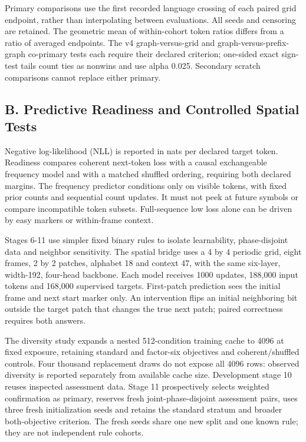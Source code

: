 \documentclass[10pt,letterpaper,twocolumn]{article}
\begin{document}
Primary comparisons use the first recorded language crossing of each paired grid endpoint, rather than interpolating between evaluations. All seeds and censoring are retained. The geometric mean of within-cohort token ratios differs from a ratio of averaged endpoints. The v4 graph-versus-grid and graph-versus-prefix-graph co-primary tests each require their declared criterion; one-sided exact sign-test tails count ties as nonwins and use alpha 0.025. Secondary scratch comparisons cannot replace either primary.

\subsection*{B. Predictive Readiness and Controlled Spatial Tests}
Negative log-likelihood (NLL) is reported in nats per declared target token. Readiness compares coherent next-token loss with a causal exchangeable frequency model and with a matched shuffled ordering, requiring both declared margins. The frequency predictor conditions only on visible tokens, with fixed prior counts and sequential count updates. It must not peek at future symbols or compare incompatible token subsets. Full-sequence low loss alone can be driven by easy markers or within-frame context.

Stages 6-11 use simpler fixed binary rules to isolate learnability, phase-disjoint data and neighbor sensitivity. The spatial bridge uses a 4 by 4 periodic grid, eight frames, 2 by 2 patches, alphabet 18 and context 47, with the same six-layer, width-192, four-head backbone. Each model receives 1000 updates, 188,000 input tokens and 168,000 supervised targets. First-patch prediction sees the initial frame and next start marker only. An intervention flips an initial neighboring bit outside the target patch that changes the true next patch; paired correctness requires both answers.

The diversity study expands a nested 512-condition training cache to 4096 at fixed exposure, retaining standard and factor-six objectives and coherent/\allowbreak{}shuffled controls. Four thousand replacement draws do not expose all 4096 rows: observed diversity is reported separately from available cache size. Development stage 10 reuses inspected assessment data. Stage 11 prospectively selects weighted confirmation as primary, reserves fresh joint-phase-disjoint assessment pairs, uses three fresh initialization seeds and retains the standard stratum and broader both-objective criterion. The fresh seeds share one new split and one known rule; they are not independent rule cohorts.
\end{document}
